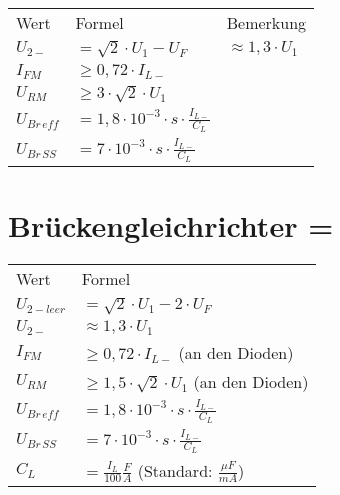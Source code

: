     \begin{table}[H]
        \begin{tabularx}{\columnwidth}{l l l}
            Wert            & Formel                                             & Bemerkung \\
            $U_{2-}$        & $=\sqrt{2}\cdot U_1-U_F$                           & $\approx 1,3\cdot U_1 $ \\
            $I_{FM}$        & $\geq 0,72\cdot I_{L-}$                            & \\
            $U_{RM}$        & $\geq 3\cdot \sqrt{2}\cdot U_1$                    & \\
            $U_{Br\, eff}$  & $=1,8\cdot 10^{-3}\cdot s\cdot\frac{I_{L-}}{C_L}$  & \\
            $U_{Br\, SS}$   & $=7\cdot 10^{-3}\cdot s\cdot\frac{I_{L-}}{C_L}$    & \\
        \end{tabularx}
    \end{table}

\section{Brückengleichrichter = }\label{sec:bruckengleichrichter}
    \begin{minipage}{0.5\columnwidth}
        \begin{table}[H]
            \begin{tabularx}{\columnwidth}{l l}
                Wert            & Formel \\
                $U_{2-leer}$    & $=\sqrt{2}\cdot U_1-2\cdot U_F$ \\
                $U_{2-}$        & $\approx 1,3\cdot U_1$ \\
                $I_{FM}$        & $\geq 0,72\cdot I_{L-}$ (an den Dioden) \\
                $U_{RM}$        & $\geq 1,5\cdot\sqrt{2}\cdot U_1$ (an den Dioden) \\
                $U_{Br\,eff}$   & $=1,8\cdot 10^{-3}\cdot s \cdot\frac{I_{L-}}{C_L}$ \\
                $U_{Br\,SS}$    & $=7\cdot 10^{-3}\cdot s \cdot\frac{I_{L-}}{C_L}$ \\
                $C_L$           & $=\frac{I_L}{100}\frac{F}{A}$ (Standard: $\frac{\mu F}{mA}$)\\
            \end{tabularx}
        \end{table}
    \end{minipage}
    \begin{minipage}{0.5\columnwidth}
    \end{minipage}

